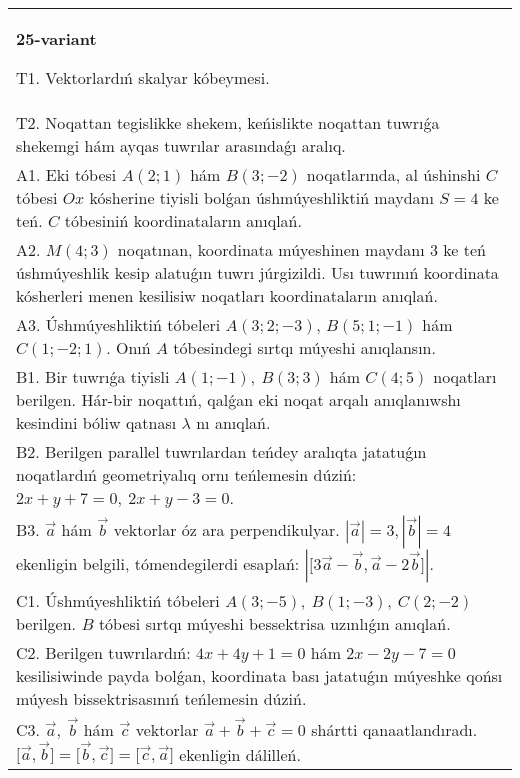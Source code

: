 \documentclass{article}
\begin{document}
\begin{tabular}{m{17cm}}
\textbf{25-variant}
\newline

T1. 
Vektorlardıń skalyar kóbeymesi.
 \\
T2. 
Noqattan tegislikke shekem, keńislikte noqattan tuwrıǵa shekemgi hám ayqas tuwrılar arasındaǵı aralıq. \\
A1. 
Eki tóbesi $A(2;1)$ hám $B(3;-2)$ noqatlarında, al
úshinshi $C$ tóbesi $Ox$ kósherine tiyisli bolǵan úshmúyeshliktiń
maydanı $S=4$ ke teń. $C$ tóbesiniń koordinataların anıqlań. \\
A2. 
$M(4;3)$ noqatınan, koordinata múyeshinen 
maydanı 3 ke teń úshmúyeshlik kesip alatuǵın tuwrı júrgizildi. 
Usı tuwrınıń koordinata kósherleri menen kesilisiw noqatları 
koordinataların anıqlań.
 \\
A3. 
Úshmúyeshliktiń tóbeleri
$A (3;2; - 3) $, $B (5;1; - 1)$ hám $C (1; - 2;1) $. Onıń $A$ tóbesindegi sırtqı múyeshi anıqlansın. 
 \\
B1. 
Bir tuwrıǵa tiyisli \(A(1;-1),\ B(3;3)\) hám
\(C(4;5)\) noqatları berilgen. Hár-bir noqattıń, qalǵan eki noqat arqalı anıqlanıwshı kesindini bóliw qatnası $\lambda$ nı anıqlań.
 \\
B2. 
Berilgen parallel tuwrılardan teńdey aralıqta jatatuǵın
noqatlardıń geometriyalıq ornı teńlemesin dúziń: $2x+y+7=0,\ 2x+y-3=0$.
 \\
B3. 
$\vec{a}$ hám $\vec{b}$ vektorlar óz ara perpendikulyar. $|\vec{a}| = 3,|\vec{b}| = 4$ ekenligin belgili, tómendegilerdi esaplań: 
$|\lbrack 3\vec{a} - \vec{b},\vec{a}-2\vec{b}\rbrack|$.
 \\
C1. 
Úshmúyeshliktiń tóbeleri
\(A(3; - 5),\ B(1; - 3),\ C(2; - 2)\) berilgen. $B$ tóbesi sırtqı
múyeshi bessektrisa uzınlıǵın anıqlań.
 \\
C2. 
Berilgen tuwrılardıń: \(4x + 4y + 1 = 0\) hám
\(2x - 2y - 7 = 0\) kesilisiwinde payda bolǵan, koordinata bası
jatatuǵın múyeshke qońsı múyesh bissektrisasınıń teńlemesin dúziń.
 \\
C3. 
\(\vec{a},\ \vec{b}\) hám \(\vec{c}\) vektorlar \(\vec{a} + \vec{b} + \vec{c} = 0\) shártti qanaatlandıradı. \(\lbrack\vec{a},\vec{b}\rbrack = \lbrack\vec{b},\vec{c}\rbrack = \lbrack\vec{c},\vec{a}\rbrack\) ekenligin dálilleń.
 \\

\end{tabular}
\vspace{1cm}
\end{document}
